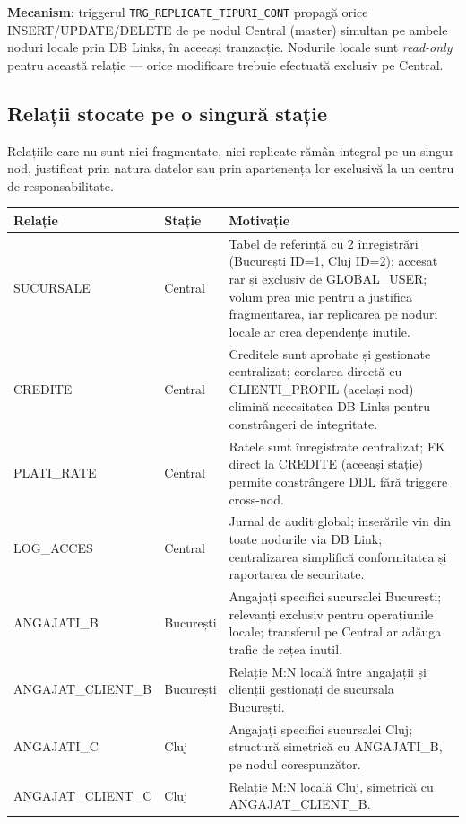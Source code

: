\documentclass[12pt,a4paper]{article}
\begin{document}
\textbf{Mecanism}: triggerul \texttt{TRG\_REPLICATE\_TIPURI\_CONT} propagă orice INSERT/UPDATE/DELETE
de pe nodul Central (master) simultan pe ambele noduri locale prin DB Links, în aceeași tranzacție.
Nodurile locale sunt \textit{read-only} pentru această relație — orice modificare trebuie efectuată
exclusiv pe Central.

\subsection{Relații stocate pe o singură stație}

Relațiile care nu sunt nici fragmentate, nici replicate rămân integral pe un singur nod,
justificat prin natura datelor sau prin apartenența lor exclusivă la un centru de responsabilitate.

\begin{center}
{\small
\begin{tabular}{p{3.8cm}p{2cm}p{7cm}}
\toprule
\textbf{Relație} & \textbf{Stație} & \textbf{Motivație} \\
\midrule
SUCURSALE & Central & Tabel de referință cu 2 înregistrări (București ID=1, Cluj ID=2);
  accesat rar și exclusiv de GLOBAL\_USER; volum prea mic pentru a justifica fragmentarea,
  iar replicarea pe noduri locale ar crea dependențe inutile. \\
CREDITE & Central & Creditele sunt aprobate și gestionate centralizat; corelarea directă cu
  CLIENTI\_PROFIL (același nod) elimină necesitatea DB Links pentru constrângeri de integritate. \\
PLATI\_RATE & Central & Ratele sunt înregistrate centralizat; FK direct la CREDITE (aceeași stație)
  permite constrângere DDL fără triggere cross-nod. \\
LOG\_ACCES & Central & Jurnal de audit global; inserările vin din toate nodurile via DB Link;
  centralizarea simplifică conformitatea și raportarea de securitate. \\
ANGAJATI\_B & București & Angajați specifici sucursalei București; relevanți exclusiv
  pentru operațiunile locale; transferul pe Central ar adăuga trafic de rețea inutil. \\
ANGAJAT\_CLIENT\_B & București & Relație M:N locală între angajații și clienții gestionați
  de sucursala București. \\
ANGAJATI\_C & Cluj & Angajați specifici sucursalei Cluj; structură simetrică cu
  ANGAJATI\_B, pe nodul corespunzător. \\
ANGAJAT\_CLIENT\_C & Cluj & Relație M:N locală Cluj, simetrică cu ANGAJAT\_CLIENT\_B. \\
\bottomrule
\end{tabular}
}
\end{center}
\end{document}
